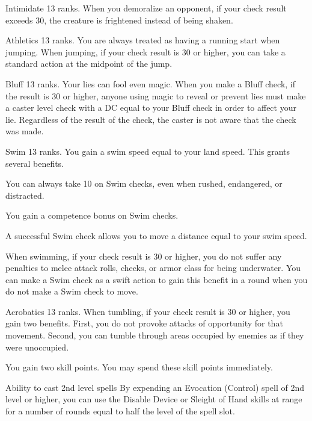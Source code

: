 \featpre Intimidate 13 ranks.
\featben When you demoralize an opponent, if your check result exceeds 30, the creature is frightened instead of being shaken.

\featpre Athletics 13 ranks.
\featben You are always treated as having a running start when jumping. When jumping, if your check result is 30 or higher, you can take a standard action at the midpoint of the jump.

\featpre Bluff 13 ranks.
\featben Your lies can fool even magic. When you make a Bluff check, if the result is 30 or higher, anyone using magic to reveal or prevent lies must make a caster level check with a DC equal to your Bluff check in order to affect your lie. Regardless of the result of the check, the caster is not aware that the check was made.

\featpre Swim 13 ranks.
\featben You gain a swim speed equal to your land speed. This grants several benefits.
\begin{itemize*}
  \item You can always take 10 on Swim checks, even when rushed, endangered, or distracted. 
  \item You gain a  competence bonus on Swim checks.
  \item A successful Swim check allows you to move a distance equal to your swim speed.
\end{itemize*}

When swimming, if your check result is 30 or higher, you do not suffer any penalties to melee attack rolls, checks, or armor class for being underwater. You can make a Swim check as a swift action to gain this benefit in a round when you do not make a Swim check to move.

\featpre Acrobatics 13 ranks.
\featben When tumbling, if your check result is 30 or higher, you gain two benefits. First, you do not provoke attacks of opportunity for that movement. Second, you can tumble through areas occupied by enemies as if they were unoccupied.

 You gain two skill points. You may spend these skill points immediately.

 Ability to cast 2nd level spells
 By expending an Evocation (Control) spell of 2nd level or higher, you can use the Disable Device or Sleight of Hand skills at \rngclose range for a number of rounds equal to half the level of the spell slot.

